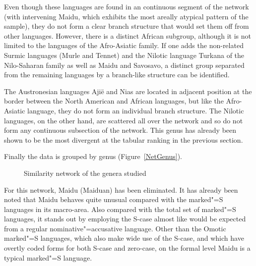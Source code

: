 Even though these languages are found in an continuous segment of the network (with intervening Maidu, which exhibits the most areally atypical pattern of the sample), they do not form a clear branch structure that would set them off from other languages. 
However, there is a distinct African subgroup, although it is not limited to the languages of the Afro-Asiatic family. 
If one adds the non-related Surmic languages (Murle and Tennet) and the Nilotic language Turkana of the Nilo-Saharan family as well as Maidu and Savosavo, a distinct group separated from the remaining languages by a branch-like structure can be identified. 

The Austronesian languages Aji\"e and Nias are located in adjacent position at the border between the North American and African languages, but like the Afro-Asiatic language, they do not form an individual branch structure.
The Nilotic languages, on the other hand, are scattered all over the network and so do not form any continuous subsection of the network.
This genus has already been shown to be the most divergent at the tabular ranking in the previous section.


Finally the data is grouped by genus (Figure~\vref{NetGenus}). 
\begin{figure}[h,t,b,p] \centering {}
\caption{Similarity network of the genera studied}\label{NetGenus}
\end{figure}
For this network, Maidu (Maiduan) has been eliminated.
It has already been noted that Maidu behaves quite unusual compared with the marked"=S languages in its macro-area.
Also compared with the total set of marked"=S languages, it stands out by employing the S-case almost like would be expected from a regular nominative"=accusative language. 
Other than the Omotic marked"=S languages, which also make wide use of the S-case, and which have overtly coded forms for both S-case and zero-case, on the formal level Maidu is a typical marked"=S language. 

